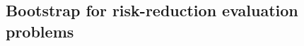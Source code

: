 \documentclass[11pt]{article}
\def\mc#1{\mathcal{#1}} %
\def\E#1{\mathrm{E}(#1)} %
\def\var#1{\mathrm{Var}(#1)} %
\theoremstyle{definition}
\newtheorem{remark}{Remark}
\begin{document}



 




\subsection{Bootstrap for risk-reduction evaluation problems}
\label{varbootstrap}
\end{document}
